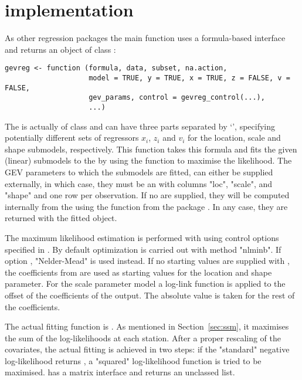 \documentclass[a4paper,nojss]{jss}
\newcommand{\CRANpkg}[1]{\href{http://CRAN.R-project.org/package=#1}{\pkg{#1}}}%
\newcommand{\samp}[1]{`\code{#1}'}%
\begin{document}
\section[R implementation]{ implementation}
\label{sec:implementation}

As other  regression packages the main function  uses a formula-based interface and returns an object of class :
%
\begin{verbatim}
gevreg <- function (formula, data, subset, na.action, 
                    model = TRUE, y = TRUE, x = TRUE, z = FALSE, v = FALSE, 
                    gev_params, control = gevreg_control(...), 
                    ...)
\end{verbatim}
%
The  is actually of class \CRANpkg{Formula} \citep{zeileis2010} and can have three parts separated by \samp{|}, specifying potentially different sets of regressors $x_i$, $z_i$ and $v_i$ for the location, scale and shape submodels, respectively. 
This function  takes this formula and fits the given (linear) submodels to the  by using the  function  to maximise the likelihood. The GEV parameters  to which the submodels are fitted, can either be supplied externally, in which case, they must be an   with columns "loc", "scale", and "shape" and one row per observation. If no  are supplied, they will be computed internally from the  using the function  from the package \CRANpkg{SpatialExtremes}. In any case, they are returned with the fitted object. 

The maximum likelihood estimation is performed with  using control options specified in . By default optimization is carried out with method "nlminb". If option , "Nelder-Mead" is used instead. If no starting values are supplied with , the coefficients from  are used as starting values for the location and shape parameter. For the scale parameter model a log-link function is applied to the offset of the coefficients of the  output. The absolute value is taken for the rest of the coefficients.

The actual fitting function is . As mentioned in Section~\ref{sec:ssm}, it maximises the sum of the log-likelihoods at each station. After a proper rescaling of the covariates, the actual fitting is achieved in two steps: if the "standard" negative log-likelihood returns , a "squared" log-likelihood function is tried to be maximised.  has a matrix interface and returns an unclassed list. 
\end{document}
